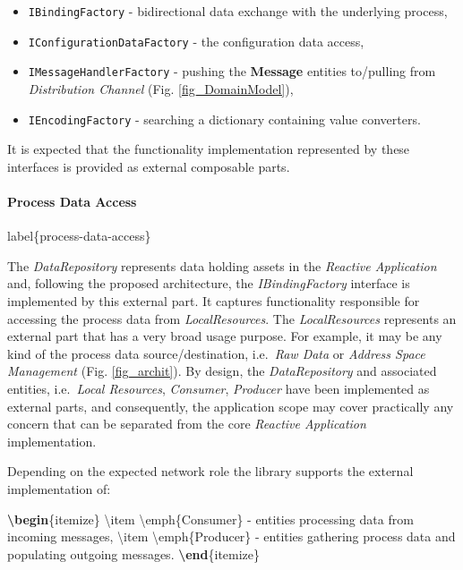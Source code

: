 \documentclass[
]{article}
\newenvironment{Shaded}{}{}
\newcommand{\ExtensionTok}[1]{#1}
\newcommand{\FunctionTok}[1]{\textcolor[rgb]{0.02,0.16,0.49}{#1}}
\newcommand{\KeywordTok}[1]{\textcolor[rgb]{0.00,0.44,0.13}{\textbf{#1}}}
\newcommand{\NormalTok}[1]{#1}
\providecommand{\tightlist}{%
  \setlength{\itemsep}{0pt}\setlength{\parskip}{0pt}}
\begin{document}
\begin{itemize}
\tightlist
\item
  \texttt{IBindingFactory} - bidirectional data exchange with the
  underlying process,
\item
  \texttt{IConfigurationDataFactory} - the configuration data access,
\item
  \texttt{IMessageHandlerFactory} - pushing the \textbf{Message}
  entities to/pulling from \emph{Distribution Channel} (Fig.
  \ref*{fig_DomainModel}),
\item
  \texttt{IEncodingFactory} - searching a dictionary containing value
  converters.
\end{itemize}

It is expected that the functionality implementation represented by
these interfaces is provided as external composable parts.

\hypertarget{process-data-access}{%
\paragraph{Process Data Access}\label{process-data-access}}

\begin{Shaded}
\begin{Highlighting}[]
\NormalTok{label\{process-data-access\}}
\end{Highlighting}
\end{Shaded}

The \emph{DataRepository} represents data holding assets in the
\emph{Reactive Application} and, following the proposed architecture,
the \emph{IBindingFactory} interface is implemented by this external
part. It captures functionality responsible for accessing the process
data from \emph{LocalResources}. The \emph{LocalResources} represents an
external part that has a very broad usage purpose. For example, it may
be any kind of the process data source/destination, i.e.~\emph{Raw Data}
or \emph{Address Space Management} (Fig. \ref*{fig_archit}). By design,
the \emph{DataRepository} and associated entities,
i.e.~\emph{Local Resources}, \emph{Consumer}, \emph{Producer} have been
implemented as external parts, and consequently, the application scope
may cover practically any concern that can be separated from the core
\emph{Reactive Application} implementation.

Depending on the expected network role the library supports the external
implementation of:

\begin{Shaded}
\begin{Highlighting}[]
\KeywordTok{\textbackslash{}begin}\NormalTok{\{}\ExtensionTok{itemize}\NormalTok{\}}
  \FunctionTok{\textbackslash{}item} \FunctionTok{\textbackslash{}emph}\NormalTok{\{Consumer\} - entities processing data from incoming messages,}
  \FunctionTok{\textbackslash{}item} \FunctionTok{\textbackslash{}emph}\NormalTok{\{Producer\} - entities gathering process data and populating outgoing messages.}
\KeywordTok{\textbackslash{}end}\NormalTok{\{}\ExtensionTok{itemize}\NormalTok{\}}
\end{Highlighting}
\end{Shaded}
\end{document}
